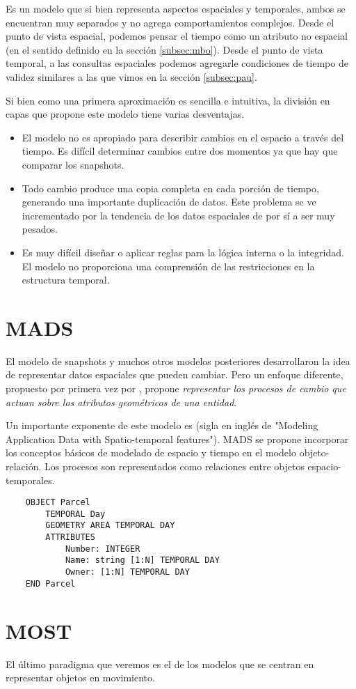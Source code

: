 Es un modelo que si bien representa aspectos espaciales y temporales,
ambos se encuentran muy separados y no agrega comportamientos complejos.
Desde el punto de vista espacial,
podemos pensar el tiempo como un atributo no espacial (en el sentido definido en la sección \ref{subsec:mbo}).
Desde el punto de vista temporal,
a las consultas espaciales podemos agregarle condiciones de tiempo de validez similares a las que vimos en la sección \ref{subsec:pau}.

Si bien como una primera aproximación es sencilla e intuitiva, la división en capas que propone este modelo tiene varias desventajas.
\begin{itemize}
    \item El modelo no es apropiado para describir cambios en el espacio a través del tiempo.
        Es difícil determinar cambios entre dos momentos ya que hay que comparar los snapshots.
    \item Todo cambio produce una copia completa en cada porción de tiempo,
        generando una importante duplicación de datos.
        Este problema se ve incrementado por la tendencia de los datos espaciales de por sí a ser muy pesados.
    \item Es muy difícil diseñar o aplicar reglas para la lógica interna o la integridad.
        El modelo no proporciona una comprensión de las restricciones en la estructura temporal.
\end{itemize}


\section{MADS}

El modelo de snapshots y muchos otros modelos posteriores desarrollaron la idea de representar datos espaciales que pueden cambiar.
Pero un enfoque diferente, propuesto por primera vez por \cite{CPS98},
propone \textit{representar los procesos de cambio que actuan sobre los atributos geométricos de una entidad}.

Un importante exponente de este modelo es \textsuperscript{\cite{PSZ99}}
(sigla en inglés de "Modeling Application Data with Spatio-temporal features").
MADS se propone incorporar los conceptos básicos de modelado de espacio y tiempo en el modelo objeto-relación.
Los procesos son representados como relaciones entre objetos espacio-temporales.


\begin{verbatim}
    OBJECT Parcel
        TEMPORAL Day
        GEOMETRY AREA TEMPORAL DAY
        ATTRIBUTES
            Number: INTEGER
            Name: string [1:N] TEMPORAL DAY
            Owner: [1:N] TEMPORAL DAY
    END Parcel
\end{verbatim}


\section{MOST}

El último paradigma que veremos es el de los modelos que se centran en representar objetos en movimiento.
